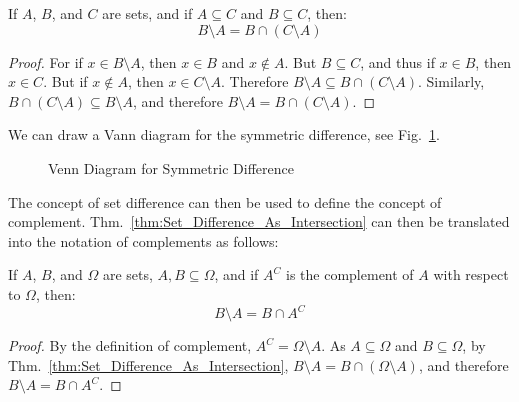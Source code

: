         \begin{theorem}
            \label{thm:Set_Difference_As_Intersection}%
            If $A$, $B$, and $C$ are sets, and if $A\subseteq{C}$ and
            $B\subseteq{C}$, then:
            \begin{equation}
                B\setminus{A}=B\cap(C\setminus{A})
            \end{equation}
        \end{theorem}
        \begin{proof}
            For if $x\in{B}\setminus{A}$, then $x\in{B}$ and $x\notin{A}$. But
            $B\subseteq{C}$, and thus if $x\in{B}$, then $x\in{C}$. But if
            $x\notin{A}$, then $x\in{C}\setminus{A}$. Therefore
            $B\setminus{A}\subseteq{B}\cap(C\setminus{A})$. Similarly,
            $B\cap(C\setminus{A})\subseteq{B}\setminus{A}$, and therefore
            $B\setminus{A}={B}\cap(C\setminus{A})$.
        \end{proof}
        We can draw a Vann diagram for the symmetric difference, see
        Fig.~\ref{fig:Sym_Diff_Venn_Diagram}.
        \begin{figure}[H]
            \centering
            \captionsetup{type=figure}
            
            \caption{Venn Diagram for Symmetric Difference}
            \label{fig:Sym_Diff_Venn_Diagram}
        \end{figure}
        The concept of set difference can then be used to define the
        concept of complement.
        Thm.~\ref{thm:Set_Difference_As_Intersection} can then be
        translated into the notation of complements as follows:
        \begin{theorem}
            If $A$, $B$, and $\Omega$ are sets,
            $A,B\subseteq\Omega$, and if $A^{C}$ is the
            complement of $A$ with respect to $\Omega$, then:
            \begin{equation}
                B\setminus{A}=B\cap{A}^{C}
            \end{equation}
        \end{theorem}
        \begin{proof}
            By the definition of complement,
            $A^{C}=\Omega\setminus{A}$.
            As $A\subseteq\Omega$ and $B\subseteq\Omega$, by
            Thm.~\ref{thm:Set_Difference_As_Intersection},
            $B\setminus{A}=B\cap(\Omega\setminus{A})$,
            and therefore $B\setminus{A}=B\cap{A}^{C}$.
        \end{proof}
